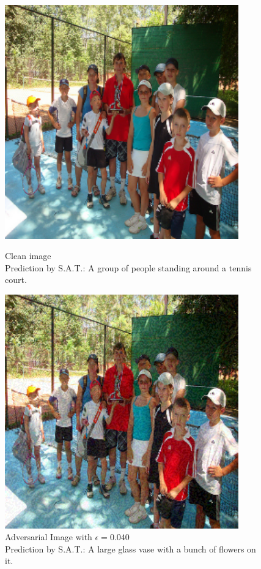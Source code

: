 \begin{figure}[ht]
    \centering
    \begin{minipage}{0.45\textwidth}
        \centering
        \includegraphics[width=0.9\textwidth]{figures/group_of_people/group_of_people_0.000.png} %
        \caption*{Clean image\\Prediction by S.A.T.: A group of people standing around a tennis court.}
    \end{minipage}\hfill
    \begin{minipage}{0.45\textwidth}
        \centering
        \includegraphics[width=0.9\textwidth]{figures/group_of_people/group_of_people_0.040.png} %
        \caption*{Adversarial Image with $\epsilon=0.040$\\Prediction by S.A.T.:  A large glass vase with a bunch of flowers on it.}
    \end{minipage}
\end{figure}

